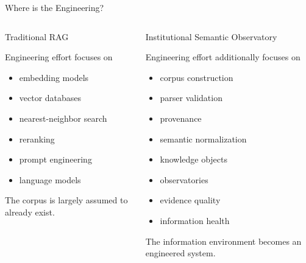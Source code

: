 \documentclass[aspectratio=169]{beamer}
\begin{document}
\begin{frame}{Where is the Engineering?}

\begin{columns}[T]



\begin{block}{Traditional RAG}

Engineering effort focuses on

\begin{itemize}
\item embedding models
\item vector databases
\item nearest-neighbor search
\item reranking
\item prompt engineering
\item language models
\end{itemize}

\vspace{0.25cm}

The corpus is largely assumed to already exist.

\end{block}



\begin{block}{Institutional Semantic Observatory}

Engineering effort additionally focuses on

\begin{itemize}
\item corpus construction
\item parser validation
\item provenance
\item semantic normalization
\item knowledge objects
\item observatories
\item evidence quality
\item information health
\end{itemize}

\vspace{0.25cm}

The information environment becomes an engineered system.


\end{block}
\end{columns}
\end{frame}
\end{document}
